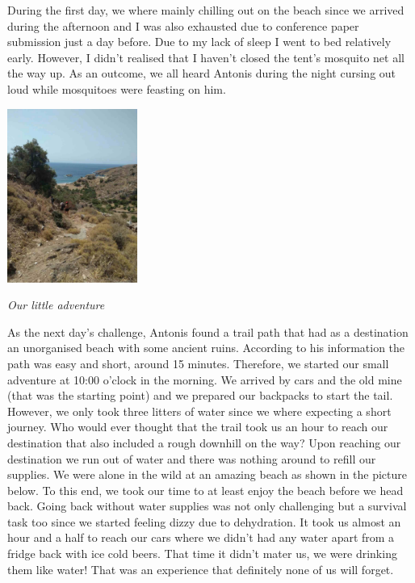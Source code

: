 \documentclass[10pt,a4paper]{article} %
\begin{document}
\begin{multicols}{3}
During the first day, we where mainly chilling out on the beach since 
we arrived during the afternoon and I was also exhausted due to conference 
paper submission just a day before. 
Due to my lack of sleep I went to bed relatively early. 
However, I didn't realised that I haven't closed the tent's mosquito net all the 
way up.  
As an outcome, we all heard Antonis during the night cursing out loud while mosquitoes 
were feasting on him.  

\begin{center}
	\includegraphics[width=0.32\textwidth]{media/way_to_beach.jpg}
	\par\textit{Our little adventure}
\end{center}

As the next day's challenge, Antonis found a trail path that had as a destination 
an unorganised beach with some ancient ruins. 
According to his information the path was easy and short, around 15 minutes. 
Therefore, we started our small adventure at 10:00 o'clock in the morning. 
We arrived by cars and the old mine (that was the starting point) and we prepared 
our backpacks to start the tail. 
However, we only took three litters of water since we where expecting a short 
journey. 
Who would ever thought that the trail took us an hour to reach our destination 
that also included a rough downhill on the way?
Upon reaching our destination we run out of water and there was nothing around 
to refill our supplies. 
We were alone in the wild at an amazing beach as shown in the picture below. 
To this end, we took our time to at least enjoy the beach before we head back. 
Going back without water supplies was not only challenging but a survival task too 
since we started feeling dizzy due to dehydration.   
It took us almost an hour and a half to reach our cars where we didn't had any water 
apart from a fridge back with ice cold beers. 
That time it didn't mater us, we were  drinking them like water! 
That was an experience that definitely none of us will forget.  



\end{multicols}
\end{document}
